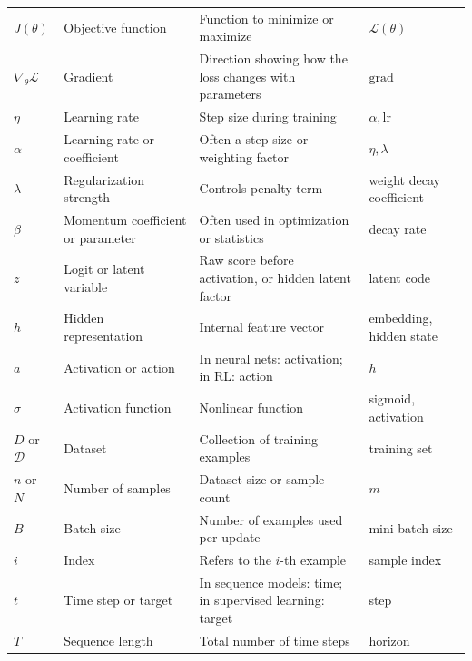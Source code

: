 \documentclass{article}
\begin{document}
\begin{longtable}{>{\centering\arraybackslash}p{2.2cm} p{3.5cm} p{5cm} p{3.5cm}}
$J(\theta)$ & Objective function & Function to minimize or maximize & $\mathcal{L}(\theta)$ \\

$\nabla_\theta \mathcal{L}$ & Gradient & Direction showing how the loss changes with parameters & $\text{grad}$ \\

$\eta$ & Learning rate & Step size during training & $\alpha, \text{lr}$ \\

$\alpha$ & Learning rate or coefficient & Often a step size or weighting factor & $\eta, \lambda$ \\

$\lambda$ & Regularization strength & Controls penalty term & weight decay coefficient \\

$\beta$ & Momentum coefficient or parameter & Often used in optimization or statistics & decay rate \\

$z$ & Logit or latent variable & Raw score before activation, or hidden latent factor & latent code \\

$h$ & Hidden representation & Internal feature vector & embedding, hidden state \\

$a$ & Activation or action & In neural nets: activation; in RL: action & $h$ \\

$\sigma$ & Activation function & Nonlinear function & sigmoid, activation \\

$D$ or $\mathcal{D}$ & Dataset & Collection of training examples & training set \\

$n$ or $N$ & Number of samples & Dataset size or sample count & $m$ \\

$B$ & Batch size & Number of examples used per update & mini-batch size \\

$i$ & Index & Refers to the $i$-th example & sample index \\

$t$ & Time step or target & In sequence models: time; in supervised learning: target & step \\

$T$ & Sequence length & Total number of time steps & horizon \\


\end{longtable}
\end{document}
